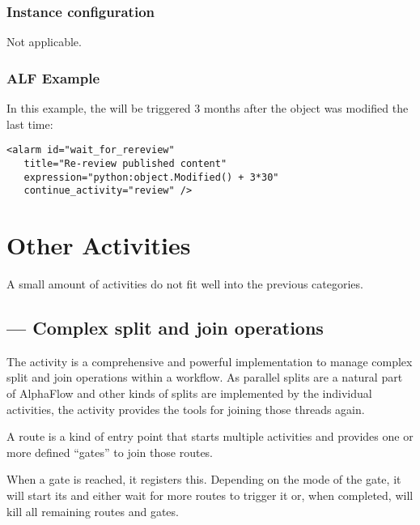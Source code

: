 \subsubsection{Instance configuration}

Not applicable.

\subsubsection{ALF Example}

In this example, the  will be triggered 3 months after the object
was modified the last time:

\begin{verbatim}
<alarm id="wait_for_rereview"
   title="Re-review published content"
   expression="python:object.Modified() + 3*30"
   continue_activity="review" />
\end{verbatim}
 
\section{Other Activities}

A small amount of activities do not fit well into the previous categories.

\subsection{ --- Complex split and join operations}
 
The  activity is a comprehensive and powerful implementation to manage complex
split and join operations within a workflow. As parallel splits are a natural
part of AlphaFlow and other kinds of splits are implemented by the individual
activities, the  activity provides the tools for joining those
threads again.

A route is a kind of entry point that starts multiple activities and provides
one or more defined ``gates'' to join those routes.

When a gate is reached, it registers this. Depending on the mode of the gate,
it will start its  and either wait for more routes to
trigger it or, when completed, will kill all remaining routes and gates.

